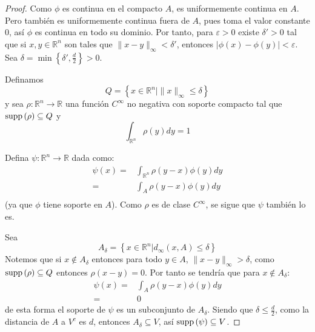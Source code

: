 \documentclass[12pt]{report}
\theoremstyle{largebreak}
\newcommand\abs[1]{\ensuremath{\lvert#1\rvert}}
\newcommand\cf[3]{\ensuremath{#1:#2\rightarrow#3}}
\newcommand\supp[1]{\ensuremath{\textup{supp}\left(#1\right)}}
\begin{document}
\begin{proof}
    Como $\phi$ es continua en el compacto $A$, es uniformemente continua en $A$. Pero también es uniformemente continua fuera de $A$, pues toma el valor constante $0$, así $\phi$ es continua en todo su dominio.
    Por tanto, para $\varepsilon>0$ existe $\delta'>0$ tal que si $x,y\in\mathbb{R}^n$ son tales que $\|x-y\|_{\infty}<\delta'$, entonces $\abs{\phi(x)-\phi(y)}<\varepsilon$. Sea $\delta =\min\left\{\delta',\frac{d}{2}\right\}>0$.
    
    Definamos
    \begin{equation*}
        Q=\left\{x\in\mathbb{R}^n|\|x\|_{\infty}\leq\delta\right\}
    \end{equation*}
    y sea $\cf{\rho}{\mathbb{R}^n}{\mathbb{R}}$ una función $C^{\infty}$ no negativa con soporte compacto tal que $\supp{\rho}\subseteq Q$ y
    \begin{equation*}
        \int_{\mathbb{R}^n}\rho(y)dy=1
    \end{equation*}
    
    Defina $\cf{\psi}{\mathbb{R}^n}{\mathbb{R}}$ dada como:
    \begin{equation*}
        \begin{split}
            \psi(x)=&\int_{\mathbb{R}^n}\rho(y-x)\phi(y)dy\\
            =&\int_{A}\rho(y-x)\phi(y)dy\\
        \end{split}
    \end{equation*}
    (ya que $\phi$ tiene soporte en $A$). Como $\rho$ es de clase $C^{\infty}$, se sigue que $\psi$ también lo es.

    Sea
    \begin{equation*}
        A_{\delta}=\left\{x\in\mathbb{R}^n|d_{\infty}(x,A)\leq\delta\right\}
    \end{equation*}
    Notemos que si $x\notin A_\delta$ entonces para todo $y\in A$, $\|x-y\|_{\infty}>\delta$, como $\supp{\rho}\subseteq Q$ entonces $\rho(x-y)=0$. Por tanto se tendría que
    para $x\notin A_\delta$:
    \begin{equation*}
        \begin{split}
            \psi(x)=&\int_{A}\rho(y-x)\phi(y)dy\\
            =&0
        \end{split}
    \end{equation*}
    de esta forma el soporte de $\psi$ es un subconjunto de $A_\delta$. Siendo que $\delta\leq\frac{d}{2}$, como la distancia de $A$ a $V^c$ es $d$, entonces $A_\delta\subseteq V$, así $\supp{\psi}\subseteq V$.


\end{proof}
\end{document}
